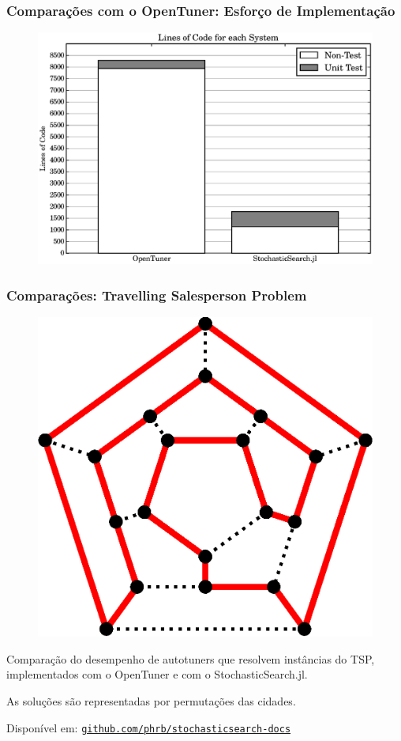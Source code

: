 \documentclass[10pt, compress]{beamer}
\begin{document}
\begin{frame}[fragile]
    \frametitle{Comparações com o OpenTuner: Esforço de Implementação}
    \begin{figure}[H]
        \centering
        \includegraphics[width=1\textwidth]{loc_comparison}
    \end{figure}%
\end{frame}

\begin{frame}[fragile]
    \frametitle{Comparações: Travelling Salesperson Problem}
    \begin{figure}[H]
        \centering
        \includegraphics[width=.28\textwidth]{hamiltonianpath}
    \end{figure}%
    Comparação do desempenho de \alert{autotuners} que resolvem
    instâncias\footnotemark{} do TSP, implementados com o OpenTuner e
    com o StochasticSearch.jl.
    \pause

    As soluções são representadas por \alert{permutações} das cidades.

    \pause
    Disponível em:
    \href{https://github.com/phrb/stochasticsearch-docs}{\tt github.com/phrb/stochasticsearch-docs}

\end{frame}
\end{document}
